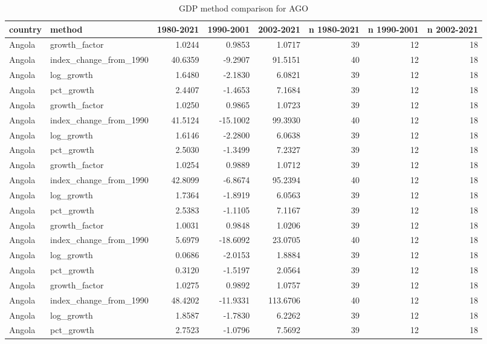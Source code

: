 \begin{table}

\caption{GDP method comparison for AGO}
\centering
\begin{tabular}[t]{llrrrrrr}
\toprule
country & method & 1980-2021 & 1990-2001 & 2002-2021 & n 1980-2021 & n 1990-2001 & n 2002-2021\\
\midrule
Angola & growth\_factor & 1.0244 & 0.9853 & 1.0717 & 39 & 12 & 18\\
Angola & index\_change\_from\_1990 & 40.6359 & -9.2907 & 91.5151 & 40 & 12 & 18\\
Angola & log\_growth & 1.6480 & -2.1830 & 6.0821 & 39 & 12 & 18\\
Angola & pct\_growth & 2.4407 & -1.4653 & 7.1684 & 39 & 12 & 18\\
Angola & growth\_factor & 1.0250 & 0.9865 & 1.0723 & 39 & 12 & 18\\
\addlinespace
Angola & index\_change\_from\_1990 & 41.5124 & -15.1002 & 99.3930 & 40 & 12 & 18\\
Angola & log\_growth & 1.6146 & -2.2800 & 6.0638 & 39 & 12 & 18\\
Angola & pct\_growth & 2.5030 & -1.3499 & 7.2327 & 39 & 12 & 18\\
Angola & growth\_factor & 1.0254 & 0.9889 & 1.0712 & 39 & 12 & 18\\
Angola & index\_change\_from\_1990 & 42.8099 & -6.8674 & 95.2394 & 40 & 12 & 18\\
\addlinespace
Angola & log\_growth & 1.7364 & -1.8919 & 6.0563 & 39 & 12 & 18\\
Angola & pct\_growth & 2.5383 & -1.1105 & 7.1167 & 39 & 12 & 18\\
Angola & growth\_factor & 1.0031 & 0.9848 & 1.0206 & 39 & 12 & 18\\
Angola & index\_change\_from\_1990 & 5.6979 & -18.6092 & 23.0705 & 40 & 12 & 18\\
Angola & log\_growth & 0.0686 & -2.0153 & 1.8884 & 39 & 12 & 18\\
\addlinespace
Angola & pct\_growth & 0.3120 & -1.5197 & 2.0564 & 39 & 12 & 18\\
Angola & growth\_factor & 1.0275 & 0.9892 & 1.0757 & 39 & 12 & 18\\
Angola & index\_change\_from\_1990 & 48.4202 & -11.9331 & 113.6706 & 40 & 12 & 18\\
Angola & log\_growth & 1.8587 & -1.7830 & 6.2262 & 39 & 12 & 18\\
Angola & pct\_growth & 2.7523 & -1.0796 & 7.5692 & 39 & 12 & 18\\

\end{tabular}
\end{table}
